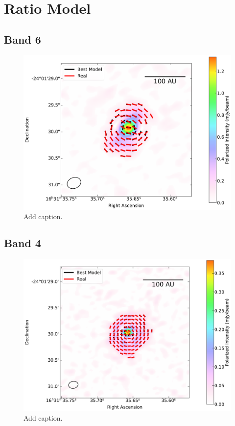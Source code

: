 \chapter{Ratio Model}
\label{ch4}

\section{Band 6}
\begin{figure}[h]
  \centering
  \includegraphics[width=1.1\textwidth]{WRITEUP_AND_IMAGES/IMAGES/IRS63_best_ratio_BAND6.pdf}
  \caption{Add caption.}
  \label{fig: }
\end{figure}



\section{Band 4}
\begin{figure}[h]
  \centering
  \includegraphics[width=1.1\textwidth]{WRITEUP_AND_IMAGES/IMAGES/IRS63_best_ratio_BAND4.pdf}
  \caption{Add caption.}
  \label{fig: }
\end{figure}